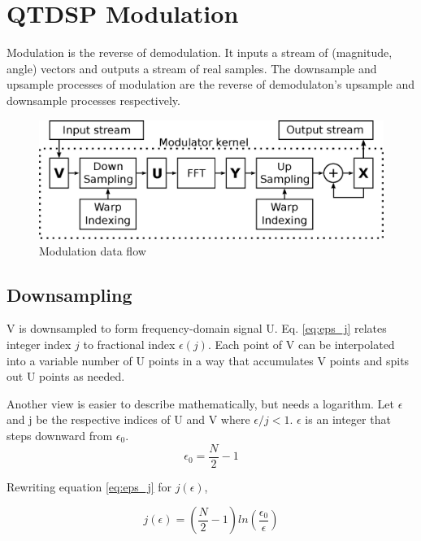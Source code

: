 \section{QTDSP Modulation}

Modulation is the reverse of demodulation.
It inputs a stream of (magnitude, angle) vectors and outputs a stream of real
samples. The downsample and upsample processes of modulation are the reverse
of demodulaton's upsample and downsample processes respectively.

\begin{figure}
	\centering
	\includegraphics[width=0.95\linewidth]{../source/mod_e}
	\caption[Relative to Quantum Time Demodulation]{Modulation data flow}
	\label{fig:mod}
\end{figure}

\subsection{Downsampling}

V is downsampled to form frequency-domain signal U.
Eq. \ref{eq:eps_j} relates integer index $j$ to fractional index $\epsilon(j)$.
Each point of V can be interpolated into a variable number of U points in a way
that accumulates V points and spits out U points as needed.

Another view is easier to describe mathematically, but needs a logarithm. Let
$\epsilon$ and j be the respective indices of U and V where $\epsilon/j < 1$.
$\epsilon$ is an integer that steps downward from $\epsilon_0$.
\begin{equation}
\epsilon_0 = \frac{N}{2} - 1
\end{equation}

Rewriting equation \ref{eq:eps_j} for $j(\epsilon)$,

\begin{equation}  \label{eq:j_eps}
j(\epsilon) = \left(\frac{N}{2}-1\right)
ln\left(\frac{\epsilon_0}{\epsilon}\right)
\end{equation}

